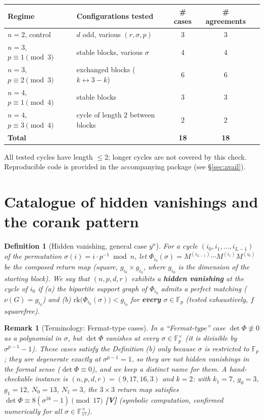 \documentclass[11pt,a4paper]{article}
\newtheorem{definition}[theorem]{Definition}
\newtheorem{remark}[theorem]{Remark}
\newcommand{\F}{\mathbb{F}}
\begin{document}
\begin{center}
\begin{tabular}{llccc}
Regime & Configurations tested & \# cases & \# agreements & \\\hline
$n=2$, control & $d$ odd, various $(r,\sigma,p)$ & 3 & 3 \\
$n=3$, $p\equiv1\!\!\pmod3$ & stable blocks, various $\sigma$ & 4 & 4 \\
$n=3$, $p\equiv2\!\!\pmod3$ & exchanged blocks ($k\leftrightarrow3{-}k$) & 6 & 6 \\
$n=4$, $p\equiv1\!\!\pmod4$ & stable blocks & 3 & 3 \\
$n=4$, $p\equiv3\!\!\pmod4$ & cycle of length $2$ between blocks & 2 & 2 \\\hline
\textbf{Total} & & \textbf{18} & \textbf{18} &
\end{tabular}
\end{center}

All tested cycles have length $\le2$; longer cycles are not covered by this check.
Reproducible code is provided in the accompanying package (see
\S\ref{sec:avail}).

\section{Catalogue of hidden vanishings and the corank pattern}

\begin{definition}[Hidden vanishing, general case $y^n$]
For a cycle $(i_0,i_1,\dots,i_{L-1})$ of the permutation $\sigma(i)=i\cdot
p^{-1}\bmod n$, let $\Phi_{i_0}(\sigma)=M^{(i_{L-1})}\cdots M^{(i_1)}M^{(i_0)}$
be the composed return map (square, $g_{i_0}\times g_{i_0}$, where $g_{i_0}$ is
the dimension of the starting block). We say that $(n,p,d,r)$ exhibits a
\textbf{hidden vanishing} at the cycle of $i_0$ if (a) the bipartite support
graph of $\Phi_{i_0}$ admits a perfect matching ($\nu(G)=g_{i_0}$) and (b)
$\mathrm{rk}\big(\Phi_{i_0}(\sigma)\big)<g_{i_0}$ for \textbf{every}
$\sigma\in\mathbb F_p$ (tested exhaustively, $f$ squarefree).
\end{definition}

\begin{remark}[Terminology: Fermat-type cases]
In a ``Fermat-type'' case $\det\Phi\not\equiv0$ as a polynomial in $\sigma$, but
$\det\Phi$ vanishes at every $\sigma\in\F_p^\times$ (it is divisible by
$\sigma^{p-1}-1$). These cases satisfy the Definition (b) only because
$\sigma$ is restricted to $\F_p$; they are degenerate exactly at
$\sigma^{p-1}=1$, so they are \emph{not} hidden vanishings in the formal sense
($\det\Phi\equiv0$), and we keep a distinct name for them. A hand-checkable instance is
$(n,p,d,r)=(9,17,16,3)$ and $k=2$: with $k_1=7$, $g_0=3$, $g_1=12$, $N_0=13$, $N_1=3$, the
$3\times3$ return map satisfies $\det\Phi\equiv8(\sigma^{16}-1)\pmod{17}$
\textbf{[V]} (symbolic computation, confirmed numerically for all $\sigma\in\F_{17}^\times$).
\end{remark}
\end{document}
